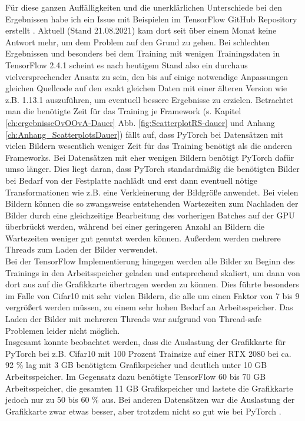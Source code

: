 Für diese ganzen Auffälligkeiten und die unerklärlichen Unterschiede bei den Ergebnissen habe ich ein Issue mit Beispielen im TensorFlow GitHub Repository erstellt \cite{githubTFIssue}. Aktuell (Stand 21.08.2021) kam dort seit über einem Monat keine Antwort mehr, um dem Problem auf den Grund zu gehen.
Bei schlechten Ergebnissen und besonders bei dem Training mit wenigen Trainingsdaten in TensorFlow 2.4.1 \cite{tensorflow} scheint es nach heutigem Stand also ein durchaus vielversprechender Ansatz zu sein, den bis auf einige notwendige Anpassungen gleichen Quellcode auf den exakt gleichen Daten mit einer älteren Version wie z.B. 1.13.1 auszuführen, um eventuell bessere Ergebnisse zu erzielen.
\newpage
Betrachtet man die benötigte Zeit für das Training je Framework (s. Kapitel \ref{ch:ergebnisseOvOOvA-Dauer} Abb. \ref{fig:ScatterplotRS-dauer} und Anhang \ref{ch:Anhang_ScatterplotsDauer}) fällt auf, dass PyTorch \cite{pytorch} bei Datensätzen mit vielen Bildern wesentlich weniger Zeit für das Training benötigt als die anderen Frameworks. Bei Datensätzen mit eher wenigen Bildern benötigt PyTorch \cite{pytorch} dafür umso länger. Dies liegt daran, dass PyTorch \cite{pytorch} standardmäßig die benötigten Bilder bei Bedarf von der Festplatte nachlädt und erst dann eventuell nötige Transformationen wie z.B. eine Verkleinerung der Bildgröße anwendet. Bei vielen Bildern können die so zwangsweise entstehenden Wartezeiten zum Nachladen der Bilder durch eine gleichzeitige Bearbeitung des vorherigen Batches auf der GPU überbrückt werden, während bei einer geringeren Anzahl an Bildern die Wartezeiten weniger gut genutzt werden können. Außerdem werden mehrere Threads zum Laden der Bilder verwendet.\\


Bei der TensorFlow \cite{tensorflow} Implementierung hingegen werden alle Bilder zu Beginn des Trainings in den Arbeitsspeicher geladen und entsprechend skaliert, um dann von dort aus auf die Grafikkarte übertragen werden zu können. Dies führte besonders im Falle von Cifar10 \cite{cifar10} mit sehr vielen Bildern, die alle um einen Faktor von 7 bis 9 vergrößert werden müssen, zu einem sehr hohen Bedarf an Arbeitsspeicher. Das Laden der Bilder mit mehreren Threads war aufgrund von Thread-safe Problemen leider nicht möglich.\\


Insgesamt konnte beobachtet werden, dass die Auslastung der Grafikkarte für PyTorch \cite{pytorch} bei z.B. Cifar10 mit 100 Prozent Trainsize auf einer RTX 2080 bei ca. 92 \% lag mit 3 GB benötigtem Grafikspeicher und deutlich unter 10 GB Arbeitsspeicher. Im Gegensatz dazu benötigte TensorFlow \cite{tensorflow} 60 bis 70 GB Arbeitsspeicher, die gesamten 11 GB Grafikspeicher und lastete die Grafikkarte jedoch nur zu 50 bis 60 \% aus.
Bei anderen Datensätzen war die Auslastung der Grafikkarte zwar etwas besser, aber trotzdem nicht so gut wie bei PyTorch \cite{pytorch}.


